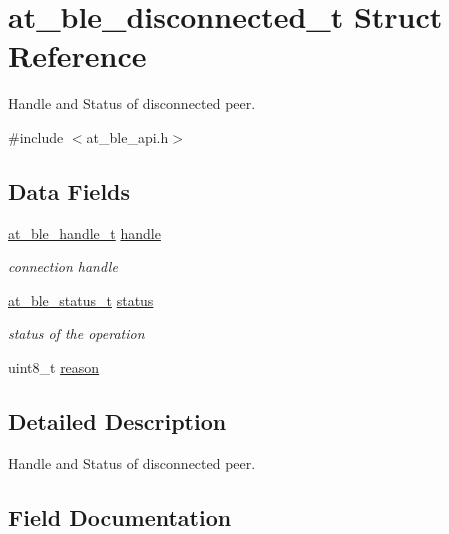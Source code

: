 \hypertarget{structat__ble__disconnected__t}{}\section{at\+\_\+ble\+\_\+disconnected\+\_\+t Struct Reference}
\label{structat__ble__disconnected__t}


Handle and Status of disconnected peer.  




{\ttfamily \#include $<$at\+\_\+ble\+\_\+api.\+h$>$}

\subsection*{Data Fields}
\begin{DoxyCompactItemize}
\item 
\mbox{\hyperlink{at__ble__api_8h_abd23646d0c662860741f787efc8456f2}{at\+\_\+ble\+\_\+handle\+\_\+t}} \mbox{\hyperlink{structat__ble__disconnected__t_ab8b0f353cb6a8d85f0822900e3b7cf35}{handle}}
\begin{DoxyCompactList}\small\item\em connection handle \end{DoxyCompactList}\item 
\mbox{\hyperlink{group__error__codes__group_ga3b1db9b95feb157b3c188ca27fe76988}{at\+\_\+ble\+\_\+status\+\_\+t}} \mbox{\hyperlink{structat__ble__disconnected__t_a0b48093fc2030779fc47e5216f8019e2}{status}}
\begin{DoxyCompactList}\small\item\em status of the operation \end{DoxyCompactList}\item 
uint8\+\_\+t \mbox{\hyperlink{structat__ble__disconnected__t_ada17c117060406a3a2871c6856dd0205}{reason}}
\end{DoxyCompactItemize}


\subsection{Detailed Description}
Handle and Status of disconnected peer. 

\subsection{Field Documentation}
\mbox{\label{structat__ble__disconnected__t_ab8b0f353cb6a8d85f0822900e3b7cf35}} 
